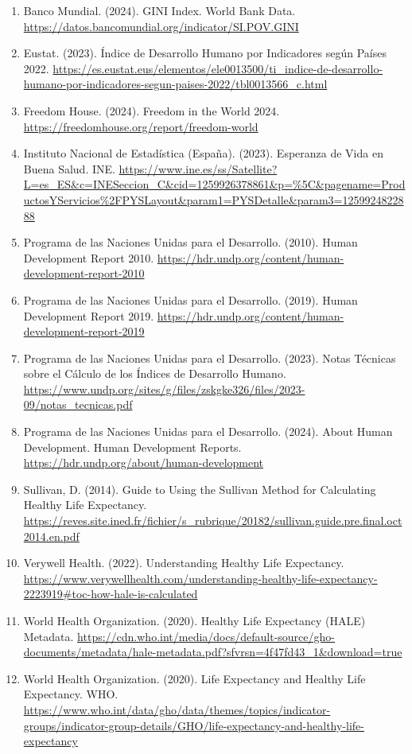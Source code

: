\documentclass[
  10pt,
]{article}
\begin{document}
\begin{enumerate}
\def\labelenumi{\arabic{enumi}.}
\item
  Banco Mundial. (2024). GINI Index. World Bank Data.
  \url{https://datos.bancomundial.org/indicator/SI.POV.GINI}
\item
  Eustat. (2023). Índice de Desarrollo Humano por Indicadores según
  Países 2022.
  \url{https://es.eustat.eus/elementos/ele0013500/ti_indice-de-desarrollo-humano-por-indicadores-segun-paises-2022/tbl0013566_c.html}
\item
  Freedom House. (2024). Freedom in the World 2024.
  \url{https://freedomhouse.org/report/freedom-world}
\item
  Instituto Nacional de Estadística (España). (2023). Esperanza de Vida
  en Buena Salud. INE.
  \url{https://www.ine.es/ss/Satellite?L=es_ES&c=INESeccion_C&cid=1259926378861&p=\%5C&pagename=ProductosYServicios\%2FPYSLayout&param1=PYSDetalle&param3=1259924822888}
\item
  Programa de las Naciones Unidas para el Desarrollo. (2010). Human
  Development Report 2010.
  \url{https://hdr.undp.org/content/human-development-report-2010}
\item
  Programa de las Naciones Unidas para el Desarrollo. (2019). Human
  Development Report 2019.
  \url{https://hdr.undp.org/content/human-development-report-2019}
\item
  Programa de las Naciones Unidas para el Desarrollo. (2023). Notas
  Técnicas sobre el Cálculo de los Índices de Desarrollo Humano.
  \url{https://www.undp.org/sites/g/files/zskgke326/files/2023-09/notas_tecnicas.pdf}
\item
  Programa de las Naciones Unidas para el Desarrollo. (2024). About
  Human Development. Human Development Reports.
  \url{https://hdr.undp.org/about/human-development}
\item
  Sullivan, D. (2014). Guide to Using the Sullivan Method for
  Calculating Healthy Life Expectancy.
  \url{https://reves.site.ined.fr/fichier/s_rubrique/20182/sullivan.guide.pre.final.oct2014.en.pdf}
\item
  Verywell Health. (2022). Understanding Healthy Life Expectancy.
  \url{https://www.verywellhealth.com/understanding-healthy-life-expectancy-2223919\#toc-how-hale-is-calculated}
\item
  World Health Organization. (2020). Healthy Life Expectancy (HALE)
  Metadata.
  \url{https://cdn.who.int/media/docs/default-source/gho-documents/metadata/hale-metadata.pdf?sfvrsn=4f47fd43_1&download=true}
\item
  World Health Organization. (2020). Life Expectancy and Healthy Life
  Expectancy. WHO.
  \url{https://www.who.int/data/gho/data/themes/topics/indicator-groups/indicator-group-details/GHO/life-expectancy-and-healthy-life-expectancy}
\end{enumerate}
\end{document}
